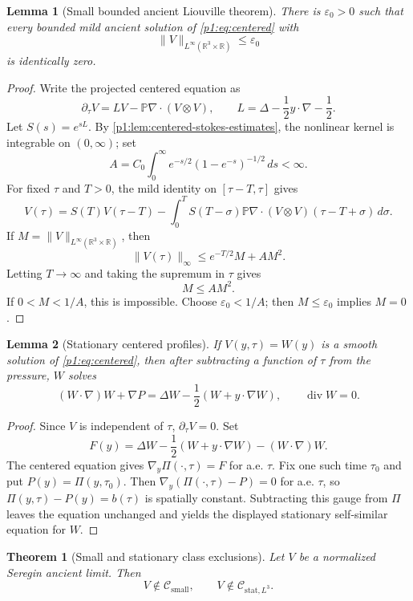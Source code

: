 \documentclass[11pt]{amsart}
\theoremstyle{plain}
\newtheorem{theorem}{Theorem}[section]
\newtheorem{lemma}[lemma]{Lemma}
\theoremstyle{definition}
\theoremstyle{remark}
\numberwithin{equation}{section}
\newcommand{\R}{\mathbb R}
\newcommand{\divergence}{\operatorname{div}}
\newcommand{\calC}{\mathcal C}
\begin{document}
\begin{lemma}[Small bounded ancient Liouville theorem]\label{p1:lem:small-liouville}
There is \(\varepsilon_0>0\) such that every bounded mild ancient solution of
\eqref{p1:eq:centered} with
\[
   \|V\|_{L^\infty(\R^3\times\R)}\le\varepsilon_0
\]
is identically zero.
\end{lemma}

\begin{proof}
Write the projected centered equation as
\[
   \partial_\tau V=LV-\mathbb P\nabla\cdot(V\otimes V),
   \qquad
   L=\Delta-\frac12 y\cdot\nabla-\frac12.
\]
Let \(S(s)=e^{sL}\).  By \cref{p1:lem:centered-stokes-estimates}, the nonlinear
kernel is integrable on \((0,\infty)\); set
\[
   A=C_0\int_0^\infty e^{-s/2}(1-e^{-s})^{-1/2}\,ds<\infty .
\]
For fixed \(\tau\) and \(T>0\), the mild identity on \([\tau-T,\tau]\) gives
\[
   V(\tau)
   =
   S(T)V(\tau-T)
   -
   \int_0^T
   S(T-\sigma)\mathbb P\nabla\cdot(V\otimes V)(\tau-T+\sigma)\,d\sigma .
\]
If \(M=\|V\|_{L^\infty(\R^3\times\R)}\), then
\[
   \|V(\tau)\|_\infty\le e^{-T/2}M+AM^2.
\]
Letting \(T\to\infty\) and taking the supremum in \(\tau\) gives
\[
   M\le AM^2.
\]
If \(0<M<1/A\), this is impossible.  Choose \(\varepsilon_0<1/A\); then
\(M\le\varepsilon_0\) implies \(M=0\).
\end{proof}

\begin{lemma}[Stationary centered profiles]\label{p1:lem:stationary-profile}
If \(V(y,\tau)=W(y)\) is a smooth solution of \eqref{p1:eq:centered}, then after
subtracting a function of \(\tau\) from the pressure, \(W\) solves
\[
   (W\cdot\nabla)W+\nabla P
   =
   \Delta W-\frac12(W+y\cdot\nabla W),
   \qquad \divergence W=0.
\]
\end{lemma}

\begin{proof}
Since \(V\) is independent of \(\tau\), \(\partial_\tau V=0\).  Set
\[
   F(y)=
   \Delta W-\frac12(W+y\cdot\nabla W)-(W\cdot\nabla)W .
\]
The centered equation gives \(\nabla_y\Pi(\cdot,\tau)=F\) for a.e. \(\tau\).
Fix one such time \(\tau_0\) and put \(P(y)=\Pi(y,\tau_0)\).  Then
\(\nabla_y(\Pi(\cdot,\tau)-P)=0\) for a.e. \(\tau\), so
\(\Pi(y,\tau)-P(y)=b(\tau)\) is spatially constant.  Subtracting this gauge
from \(\Pi\) leaves the equation unchanged and yields the displayed
stationary self-similar equation for \(W\).
\end{proof}

\begin{theorem}[Small and stationary class exclusions]
\label{p1:thm:classical-classes}
Let \(V\) be a normalized Seregin ancient limit.  Then
\[
   V\notin \calC_{\mathrm{small}},
   \qquad
   V\notin \calC_{\mathrm{stat},L^3}.
\]
\end{theorem}
\end{document}
